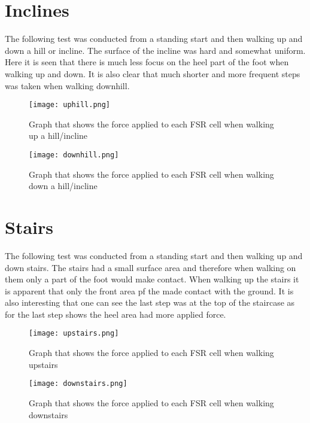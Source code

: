 \section{Inclines}
\label{sec:inclines}
The following test was conducted from a standing start and then walking up and down a hill or incline. The surface  of the incline was hard and somewhat uniform. Here it is seen that there is much less focus on the heel part of the foot when walking up and down. It is also clear that much shorter and more frequent steps was taken when walking downhill. 

\begin{figure}[!htb]
    \centering
    \texttt{[image: uphill.png]}
    \caption{Graph that shows the force applied to each FSR cell when walking up a hill/incline}
    \label{fig:uphill}
\end{figure}

\begin{figure}[!htb]
    \centering
    \texttt{[image: downhill.png]}
    \caption{Graph that shows the force applied to each FSR cell when walking down a hill/incline}
    \label{fig:downhill}
\end{figure}

\clearpage
\section{Stairs}
The following test was conducted from a standing start and then walking up and down stairs. The stairs had a small surface area and therefore when walking on them only a part of the foot would make contact. When walking up the stairs it is apparent that only the front area pf the made contact with the ground. It is also interesting that one can see the last step was at the top of the staircase as for the last step shows the heel area had more applied force.
\label{sec:stairs}
\begin{figure}[!htb]
    \centering
    \texttt{[image: upstairs.png]}
    \caption{Graph that shows the force applied to each FSR cell when walking upstairs}
    \label{fig:upstairs}
\end{figure}
\begin{figure}[!htb]
    \centering
    \texttt{[image: downstairs.png]}
    \caption{Graph that shows the force applied to each FSR cell when walking downstairs}
    \label{fig:downstairs}
\end{figure}